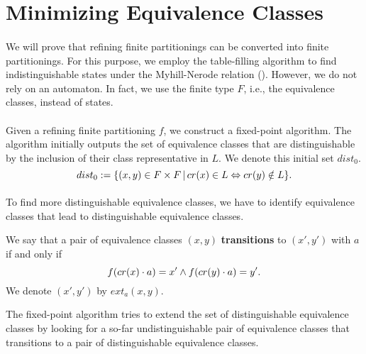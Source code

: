 \documentclass[11pt,a4paper,oneside]{book}
\begin{document}
    \section{Minimizing Equivalence Classes}

        \paragraph{}
            We will prove that refining finite partitionings can be converted into finite partitionings. 
            For this purpose, we employ the table-filling algorithm to find indistinguishable states under the Myhill-Nerode relation (\cite{DBLP:books/daglib/0011126}).
            However, we do not rely on an automaton. 
            In fact, we use the finite type $F$, i.e., the equivalence classes, instead of states.

        \paragraph{}
            Given a refining finite partitioning $f$, we construct a fixed-point algorithm.
            The algorithm initially outputs the set of equivalence classes that are distinguishable by the inclusion of their class representative in $L$. 
            We denote this initial set $dist_0$.
            \[
                dist_0 := \{ (x,y)  \in F \times F \, | \, cr(x) \in L \Leftrightarrow cr(y) \notin L\}.
            \]
            
        \paragraph{}
            To find more distinguishable equivalence classes, we have to identify equivalence classes that lead to distinguishable equivalence classes. 
            \begin{definition}
                We say that a pair of equivalence classes $(x,y)$ \textbf{transitions} to $(x', y')$ with $a$ if and only if
                \[
                    f (cr(x)\cdot a) = x' \wedge f (cr(y) \cdot a) = y'.
                \]
                We denote $(x', y')$ by $ext_a(x,y)$.
            \end{definition}

            The fixed-point algorithm tries to extend the set of distinguishable equivalence classes by looking for a so-far undistinguishable pair of equivalence classes that transitions to a pair of distinguishable equivalence classes.
\end{document}

